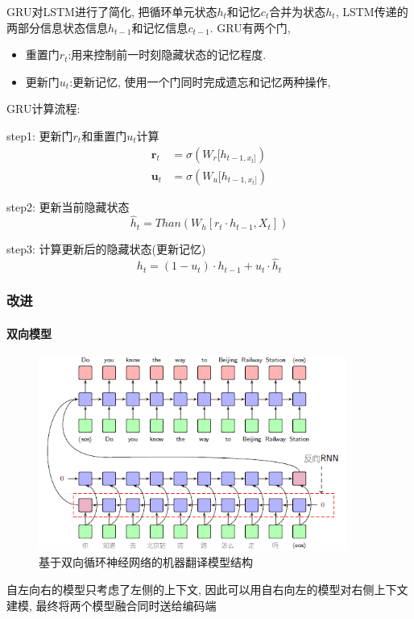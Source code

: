 \documentclass[a4paper]{article}
\theoremstyle{definition}
\numberwithin{equation}{section}
\begin{document}
GRU对LSTM进行了简化, 把循环单元状态$h_t$和记忆$c_t$合并为状态$h_t$, 
LSTM传递的两部分信息状态信息$h_{t−1}$和记忆信息$c_{t−1}$. 
GRU有两个门, 
\begin{itemize}
    \item 重置门$r_t$:用来控制前一时刻隐藏状态的记忆程度.
    \item 更新门$u_t$:更新记忆, 使用一个门同时完成遗忘和记忆两种操作, 
\end{itemize}

GRU计算流程:

step1: 更新门$r_t$和重置门$u_t$计算
\begin{align*}
\mathbf{r}_t  & =\sigma(W_r[h_{t-1, x_t]}) \\
\mathbf{u}_t &  =\sigma(W_u[h_{t-1, x_t]})
\end{align*} 

step2: 更新当前隐藏状态 
$$\hat{h}_t=Than(W_h[r_t \cdot h_{t-1}, X_t])$$

step3: 计算更新后的隐藏状态(更新记忆)
$$h_t=(1-u_t) \cdot h_{t-1} + u_t\cdot \hat{h}_t$$

\subsubsection{改进}
\paragraph{双向模型}

\begin{figure}[htp]
    \centering
    \includegraphics[width=0.9\textwidth]{dual_direction_ML.png}
    \caption{基于双向循环神经网络的机器翻译模型结构}
    \end{figure}
自左向右的模型只考虑了左侧的上下文, 因此可以用自右向左的模型对右侧上下文建模, 最终将两个模型融合同时送给编码端
\end{document}

